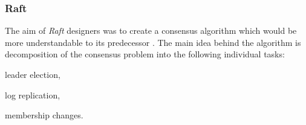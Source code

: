 










\subsubsection{Raft}
The aim of \emph{Raft} designers was to create a consensus algorithm which would be more understandable to its predecessor \cite{ongaro2014search}. 
The main idea behind the algorithm is decomposition of the consensus problem into the following individual tasks:
\begin{enumerate*}
\item leader election,
\item log replication,
\item membership changes.
\end{enumerate*} 
 
